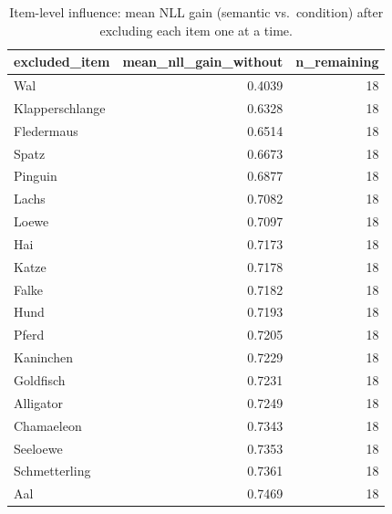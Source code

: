 \begin{table}[htbp]
\centering
\caption{Item-level influence: mean NLL gain (semantic vs.\ condition) after excluding each item one at a time.}
\label{tab:item-influence}
\begin{tabular}{lrr}
\toprule
excluded\_item & mean\_nll\_gain\_without & n\_remaining \\
\midrule
Wal & 0.4039 & 18 \\
Klapperschlange & 0.6328 & 18 \\
Fledermaus & 0.6514 & 18 \\
Spatz & 0.6673 & 18 \\
Pinguin & 0.6877 & 18 \\
Lachs & 0.7082 & 18 \\
Loewe & 0.7097 & 18 \\
Hai & 0.7173 & 18 \\
Katze & 0.7178 & 18 \\
Falke & 0.7182 & 18 \\
Hund & 0.7193 & 18 \\
Pferd & 0.7205 & 18 \\
Kaninchen & 0.7229 & 18 \\
Goldfisch & 0.7231 & 18 \\
Alligator & 0.7249 & 18 \\
Chamaeleon & 0.7343 & 18 \\
Seeloewe & 0.7353 & 18 \\
Schmetterling & 0.7361 & 18 \\
Aal & 0.7469 & 18 \\
\bottomrule
\end{tabular}
\end{table}